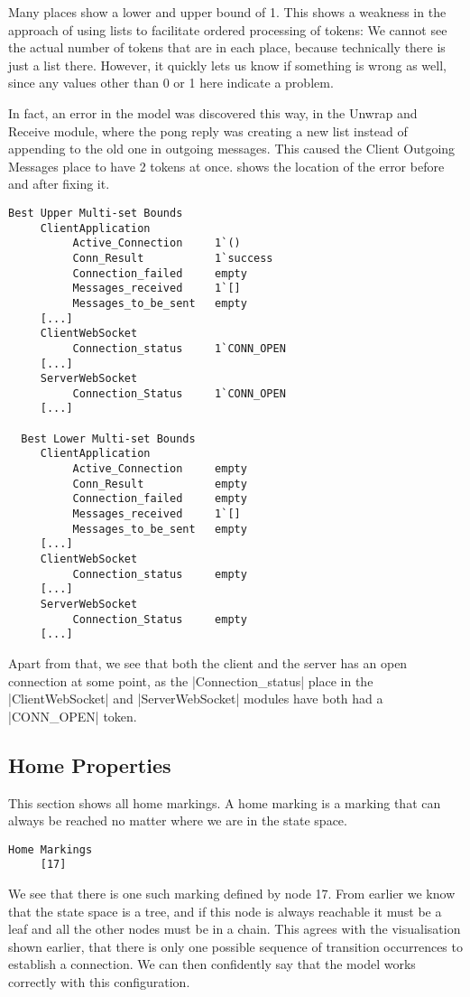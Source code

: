 	Many places show a lower and upper bound of 1. This shows a weakness
	in the approach of using lists to facilitate ordered processing of tokens: We
	cannot see the actual number of tokens that are in each place, because
	technically there is just a list there. However, it quickly lets us know if
	something is wrong as well, since any values other than 0 or 1 here indicate a
	problem. 
	
	In fact, an error in the model was discovered this way, in the Unwrap and
	Receive module, where the pong reply was creating a new list instead of
	appending to the old one in outgoing messages. This caused the Client Outgoing
	Messages place to have 2 tokens at once.  shows the location
	of the error before and after fixing it.
	
	\begin{lstlisting}[language={},tabsize=4]
  Best Upper Multi-set Bounds
     ClientApplication
          Active_Connection		1`()
          Conn_Result			1`success
          Connection_failed		empty
          Messages_received		1`[]
          Messages_to_be_sent	empty
     [...]
     ClientWebSocket
          Connection_status		1`CONN_OPEN
     [...]
     ServerWebSocket
          Connection_Status		1`CONN_OPEN
     [...]

  Best Lower Multi-set Bounds
     ClientApplication
          Active_Connection		empty
          Conn_Result			empty
          Connection_failed		empty
          Messages_received		1`[]
          Messages_to_be_sent	empty
     [...]
     ClientWebSocket
          Connection_status		empty
     [...]
     ServerWebSocket
          Connection_Status		empty
     [...]
	\end{lstlisting}
	
	Apart from that, we see that both the client and the server has an open
	connection at some point, as the |Connection_status| place in the
	|ClientWebSocket| and |ServerWebSocket| modules have both had a |CONN_OPEN|
	token.
	
	\subsection{Home Properties}
	This section shows all home markings. A home marking is a marking that can
	always be reached no matter where we are in the state space. 
	\begin{lstlisting}[language={}]
  Home Markings
     [17]
	\end{lstlisting}
	We see that there is one such marking defined by node 17. From earlier we know
	that the state space is a tree, and if this node is always reachable it must be a leaf
	and all the other nodes must be in a chain. This agrees with the visualisation
	shown earlier, that there is only one possible sequence of transition
	occurrences to establish a connection. We can then confidently say that the
	model works correctly with this configuration. 
	
